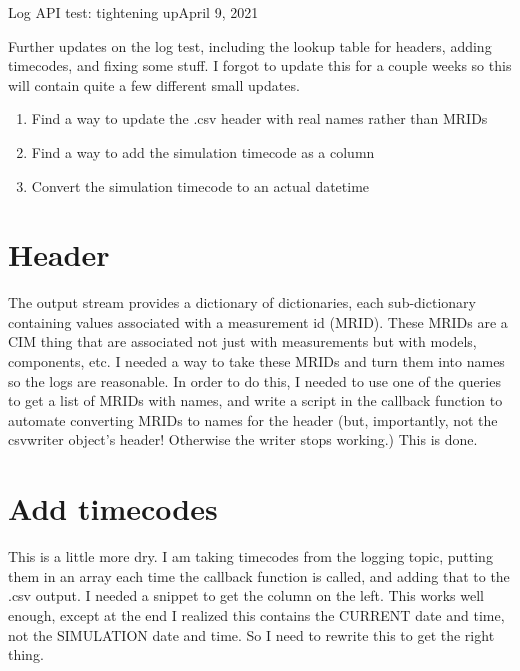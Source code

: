 \begin{entry}{Log API test: tightening up}{April 9, 2021}
    \objective 
    
    Further updates on the log test, including the lookup table for headers, adding timecodes, and fixing some stuff.
    I forgot to update this for a couple weeks so this will contain quite a few different small updates.
    \outline
    
    \begin{enumerate}
        \item Find a way to update the .csv header with  real names rather than MRIDs
        \item Find a way to add the simulation timecode as a column
        \item Convert the simulation timecode to an actual datetime
    \end{enumerate}
    
    \procedures
    
        \section{Header}
            The output stream provides a dictionary of dictionaries, each sub-dictionary containing values associated with
            a measurement id (MRID). These MRIDs are a CIM thing that are associated not just with measurements but with
            models, components, etc. I needed a way to take these MRIDs and turn them into names so the logs are reasonable.
            In order to do this, I needed to use one of the queries to get a list of MRIDs with names, and write a script
            in the callback function to automate converting MRIDs to names for the header (but, importantly, not the csvwriter
            object's header! Otherwise the writer stops working.) This is done.

        \section{Add timecodes}
            This is a little more dry. I am taking timecodes from the logging topic, putting them in an array each
            time the callback function is called, and adding that to the .csv output. I needed a snippet to get the
            column on the left. This works well enough, except at the end I realized this contains the CURRENT date
            and time, not the SIMULATION date and time. So I need to rewrite this to get the right thing.


\end{entry}
